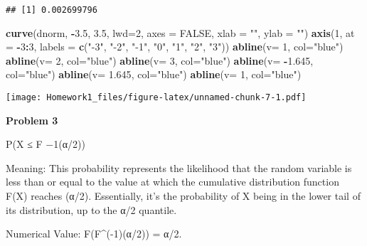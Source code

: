 \documentclass[
]{article}
\newenvironment{Shaded}{\begin{snugshade}}{\end{snugshade}}
\newcommand{\AttributeTok}[1]{\textcolor[rgb]{0.13,0.29,0.53}{#1}}
\newcommand{\ConstantTok}[1]{\textcolor[rgb]{0.56,0.35,0.01}{#1}}
\newcommand{\DecValTok}[1]{\textcolor[rgb]{0.00,0.00,0.81}{#1}}
\newcommand{\FloatTok}[1]{\textcolor[rgb]{0.00,0.00,0.81}{#1}}
\newcommand{\FunctionTok}[1]{\textcolor[rgb]{0.13,0.29,0.53}{\textbf{#1}}}
\newcommand{\NormalTok}[1]{#1}
\newcommand{\SpecialCharTok}[1]{\textcolor[rgb]{0.81,0.36,0.00}{\textbf{#1}}}
\newcommand{\StringTok}[1]{\textcolor[rgb]{0.31,0.60,0.02}{#1}}
\begin{document}
\begin{verbatim}
## [1] 0.002699796
\end{verbatim}

\begin{Shaded}
\begin{Highlighting}[]
\FunctionTok{curve}\NormalTok{(dnorm, }\SpecialCharTok{{-}}\FloatTok{3.5}\NormalTok{, }\FloatTok{3.5}\NormalTok{, }\AttributeTok{lwd=}\DecValTok{2}\NormalTok{, }\AttributeTok{axes =} \ConstantTok{FALSE}\NormalTok{, }\AttributeTok{xlab =} \StringTok{""}\NormalTok{, }\AttributeTok{ylab =} \StringTok{""}\NormalTok{)}
\FunctionTok{axis}\NormalTok{(}\DecValTok{1}\NormalTok{, }\AttributeTok{at =} \SpecialCharTok{{-}}\DecValTok{3}\SpecialCharTok{:}\DecValTok{3}\NormalTok{, }\AttributeTok{labels =} \FunctionTok{c}\NormalTok{(}\StringTok{"{-}3"}\NormalTok{, }\StringTok{"{-}2"}\NormalTok{, }\StringTok{"{-}1"}\NormalTok{, }\StringTok{"0"}\NormalTok{, }\StringTok{"1"}\NormalTok{, }\StringTok{"2"}\NormalTok{, }\StringTok{"3"}\NormalTok{))}
\FunctionTok{abline}\NormalTok{(}\AttributeTok{v=} \DecValTok{1}\NormalTok{, }\AttributeTok{col=}\StringTok{"blue"}\NormalTok{)}
\FunctionTok{abline}\NormalTok{(}\AttributeTok{v=} \DecValTok{2}\NormalTok{, }\AttributeTok{col=}\StringTok{"blue"}\NormalTok{)}
\FunctionTok{abline}\NormalTok{(}\AttributeTok{v=} \DecValTok{3}\NormalTok{, }\AttributeTok{col=}\StringTok{"blue"}\NormalTok{)}
\FunctionTok{abline}\NormalTok{(}\AttributeTok{v=} \SpecialCharTok{{-}}\FloatTok{1.645}\NormalTok{, }\AttributeTok{col=}\StringTok{"blue"}\NormalTok{)}
\FunctionTok{abline}\NormalTok{(}\AttributeTok{v=} \FloatTok{1.645}\NormalTok{, }\AttributeTok{col=}\StringTok{"blue"}\NormalTok{)}
\FunctionTok{abline}\NormalTok{(}\AttributeTok{v=} \DecValTok{1}\NormalTok{, }\AttributeTok{col=}\StringTok{"blue"}\NormalTok{)}
\end{Highlighting}
\end{Shaded}

\texttt{[image: Homework1\_files/figure-latex/unnamed-chunk-7-1.pdf]}

\textbf{Problem 3}

P(X ≤ F −1(α/2))

Meaning: This probability represents the likelihood that the random
variable is less than or equal to the value at which the cumulative
distribution function F(X) reaches (α/2). Essentially, it's the
probability of X being in the lower tail of its distribution, up to the
α/2 quantile.

Numerical Value: F(F\^{}(-1)(α/2)) = α/2.
\end{document}

